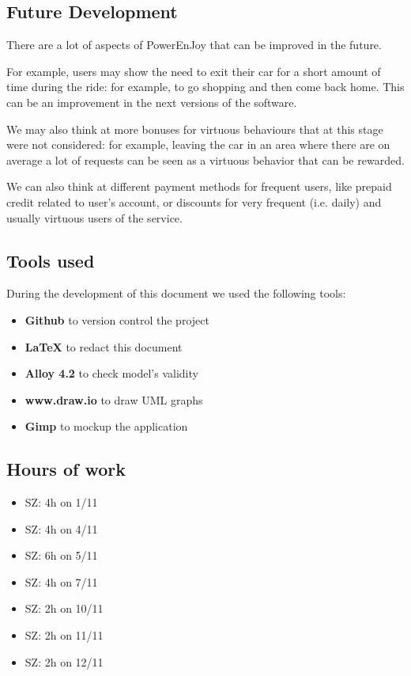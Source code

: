\documentclass[11pt]{article} %
\newcommand{\pe}{PowerEnJoy }
\begin{document}
\subsection{Future Development}
There are a lot of aspects of \pe that can be improved in the future.

For example, users may show the need to exit their car for a short amount of time during the ride: for example, to go shopping and then come back home. This can be an improvement in the next versions of the software.

We may also think at more bonuses for virtuous behaviours that at this stage were not considered: for example, leaving the car in an area where there are on average a lot of requests can be seen as a virtuous behavior that can be rewarded.

We can also think at different payment methods for frequent users, like prepaid credit related to user's account, or discounts for very frequent (i.e. daily) and usually virtuous users of the service.

\subsection{Tools used}
During the development of this document we used the following tools:
\begin{itemize}
	\item \textbf{Github} to version control the project
	\item \textbf{\LaTeX} to redact this document
	\item \textbf{Alloy 4.2} to check model's validity
	\item \textbf{www.draw.io} to draw UML graphs
	\item \textbf{Gimp} to mockup the application
\end{itemize}

\subsection{Hours of work}

\begin{itemize}
	\item SZ: 4h on 1/11
	\item SZ: 4h on 4/11
	\item SZ: 6h on 5/11
	\item SZ: 4h on 7/11
	\item SZ: 2h on 10/11
	\item SZ: 2h on 11/11
	\item SZ: 2h on 12/11
\end{itemize}
\end{document}
